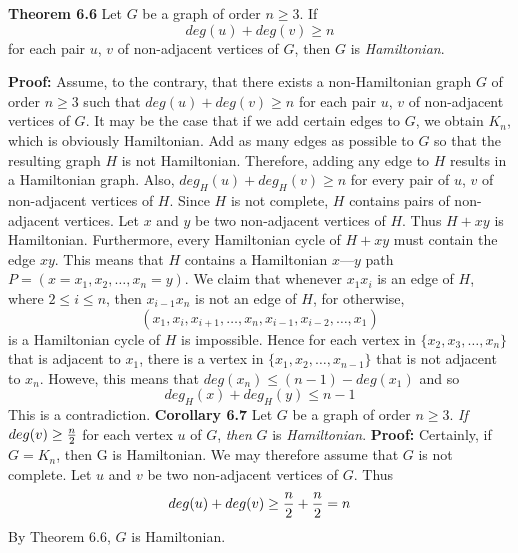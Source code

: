 \nopagenumbers
{\bf Theorem 6.6}
\vskip 6pt
Let $G$ be a graph of order $n \geq 3$. If $$deg(u)+deg(v) \geq n$$
for each pair $u$, $v$ of non-adjacent vertices of $G$, then $G$ is {\it Hamiltonian}.

\vskip 10pt
{\bf Proof:}
\vskip 6pt
Assume, to the contrary, that there exists a non-Hamiltonian graph $G$ of order $n \geq 3$ such that
$deg(u)+deg(v) \geq n$ for each pair $u$, $v$ of non-adjacent vertices of $G$. It may be the case that if we
add certain edges to $G$, we obtain $K_n$, which is obviously Hamiltonian. Add as many edges as possible to $G$
so that the resulting graph $H$ is not Hamiltonian. Therefore, adding any edge to $H$ results in a Hamiltonian graph.
Also, $deg_H(u)+deg_H(v) \geq n$ for every pair of $u$, $v$ of non-adjacent vertices of $H$.
\vskip 1mm
Since $H$ is not complete, $H$ contains pairs of non-adjacent vertices. Let $x$ and $y$ be two non-adjacent
vertices of $H$. Thus $H+xy$ is Hamiltonian. Furthermore, every Hamiltonian cycle of $H+xy$ must contain the edge $xy$.
This means that $H$ contains a Hamiltonian $x$---$y$ path $P=(x=x_1,x_2, \ldots ,x_n=y)$. We claim that whenever 
$x_1x_i$ is an edge of $H$, where $2 \leq i \leq n$, then $x_{i-1}x_n$ is not an edge of $H$, for otherwise,
$$(x_1,x_i,x_{i+1}, \ldots , x_n,x_{i-1},x_{i-2}, \ldots ,x_1)$$
is a Hamiltonian cycle of $H$ is impossible. Hence for each vertex in $ \lbrace x_2,x_3, \ldots ,x_n \rbrace $ that is
adjacent to $x_1$, there is a vertex in $ \lbrace x_1,x_2, \ldots , x_{n-1} \rbrace $ that is not adjacent to $x_n$.
Howeve, this means that $deg(x_n) \leq (n-1)-deg(x_1) $ and so $$deg_H(x)+deg_H(y) \leq n-1$$ This is a contradiction.
\vskip 1in
{\bf Corollary 6.7}
\vskip 6pt
Let $G$ be a graph of order $n \geq 3$. {\it If} $deg(v) \geq {n \over 2}$ for each vertex $u$ of $G$, {\it then} $G$ is {\it Hamiltonian}.
\vskip 10pt
{\bf Proof:}
\vskip 6pt
Certainly, if $G=K_n$, then G is Hamiltonian. We may therefore assume that $G$ is not complete. Let $u$ and $v$ be two non-adjacent vertices of $G$.
Thus $$deg(u)+deg(v) \geq {n \over 2}+{n \over 2}=n$$ By Theorem 6.6, $G$ is Hamiltonian.

\vfill\eject
